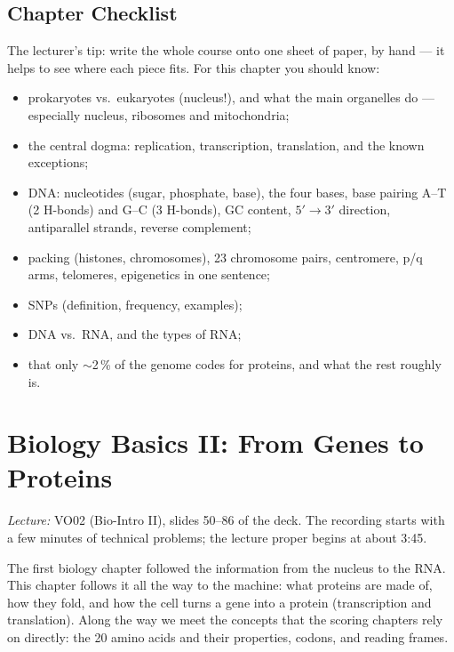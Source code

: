 \documentclass[11pt, oneside]{book}
\newcommand{\lectureref}[1]{%
  \par{\small\color{gray!70!black}\textit{Lecture:} #1}\par}
\let\originalsection\section
\renewcommand{\section}{\Needspace{7\baselineskip}\originalsection}
\begin{document}
\section{Chapter Checklist}

The lecturer's tip: write the whole course onto one sheet of paper, by hand
--- it helps to see where each piece fits. For this chapter you should know:
\begin{itemize}
  \item prokaryotes vs.\ eukaryotes (nucleus!), and what the main organelles
    do --- especially nucleus, ribosomes and mitochondria;
  \item the central dogma: replication, transcription, translation, and the
    known exceptions;
  \item DNA: nucleotides (sugar, phosphate, base), the four bases, base
    pairing A--T (2 H-bonds) and G--C (3 H-bonds), GC content, $5' \to 3'$
    direction, antiparallel strands, reverse complement;
  \item packing (histones, chromosomes), 23 chromosome pairs, centromere,
    p/q arms, telomeres, epigenetics in one sentence;
  \item SNPs (definition, frequency, examples);
  \item DNA vs.\ RNA, and the types of RNA;
  \item that only $\sim$2\,\% of the genome codes for proteins, and what
    the rest roughly is.
\end{itemize}

\chapter{Biology Basics II: From Genes to Proteins}
\label{ch:bio2}

\lectureref{VO02 (Bio-Intro II), slides 50--86 of the deck. The recording
starts with a few minutes of technical problems; the lecture proper begins
at about 3:45.}

The first biology chapter followed the information from the nucleus to the
RNA. This chapter follows it all the way to the machine: what proteins are
made of, how they fold, and how the cell turns a gene into a protein
(transcription and translation). Along the way we meet the concepts that
the scoring chapters rely on directly: the 20 amino acids and their
properties, codons, and reading frames.
\end{document}

